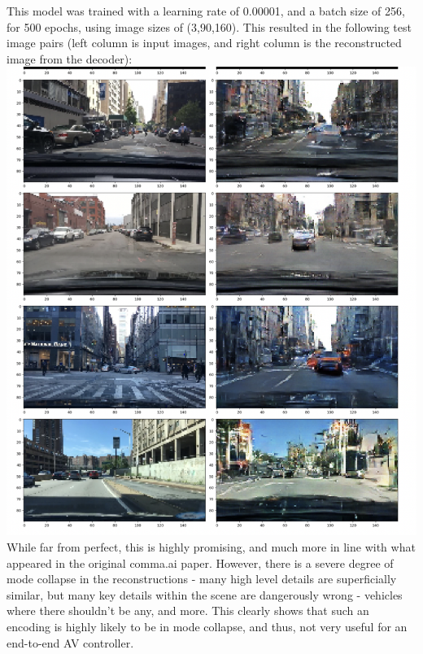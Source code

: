 \documentclass{article}
\begin{document}
This model was trained with a learning rate of 0.00001, and a batch size of 256, for 500 epochs, using image sizes of (3,90,160). This resulted in the following test image pairs (left column is input images, and right column is the reconstructed image from the decoder): \\
\includegraphics[scale=0.5]{results1.png} \\
While far from perfect, this is highly promising, and much more in line with what appeared in the original comma.ai paper. However, there is a severe degree of mode collapse in the reconstructions - many high level details are superficially similar, but many key details within the scene are dangerously wrong - vehicles where there shouldn't be any, and more. This clearly shows that such an encoding is highly likely to be in mode collapse, and thus, not very useful for an end-to-end AV controller.
\end{document}
